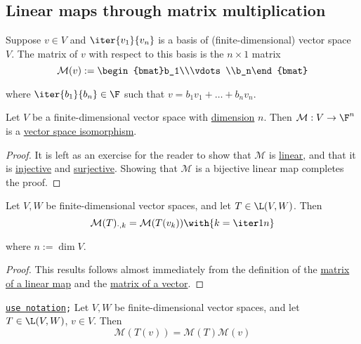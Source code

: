 \subsection{Linear maps through matrix multiplication}\label{b9542d8}

\label{fc5a127}

Suppose $v\in V$ and $\iter{v_1}{v_n}$ is a basis of (finite-dimensional)
vector space $V$. The matrix of $v$ with respect to this basis is the
$n\times1$ matrix
$$
  \mathcal M(v):=\begin{bmat}b_1\\\vdots\\b_n\end{bmat}
$$

where $\iter{b_1}{b_n}\in\F$ such that $v=b_1v_1+\ldots+b_nv_n$.

\label{d637076}

Let $V$ be a finite-dimensional vector space with \href{cd4284b}{dimension}
$n$. Then $\mathcal M:V\to\F^n$ is a \href{d0ad6cb}{vector space isomorphism}.

\begin{proof}
  It is left as an exercise for the reader to show that $\mathcal M$ is
  \href{d7d1925}{linear}, and that it is \href{ac44d1d}{injective} and
  \href{bd75843}{surjective}. Showing that $\mathcal M$ is a bijective linear
  map completes the proof.
\end{proof}

\label{ec0cf28}

Let $V,W$ be finite-dimensional vector spaces, and let $T\in\L(V,W)$. Then
$$
  \mathcal M(T)_{\cdot,k}=\mathcal M(T(v_k))\with{k=\iter1n}
$$

where $n:=\dim V$.

\begin{proof}
  This results follows almost immediately from the definition of the
  \href{c70dad0}{matrix of a linear map} and the \href{fc5a127}{matrix of a
  vector}.
\end{proof}

\label{e48294c}

\texttt{\href{d76dfe6}{use notation};} Let $V,W$ be finite-dimensional vector
spaces, and let $T\in\L(V,W)$, $v\in V$. Then
$$
  \mathcal M(T(v))=\mathcal M(T)\mathcal M(v)
$$

